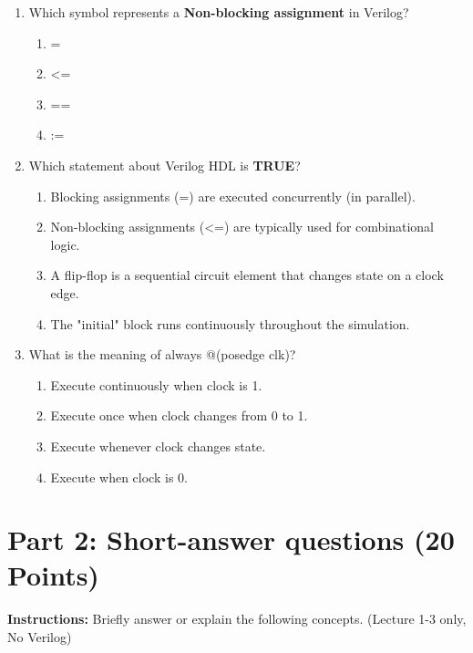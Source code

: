 \documentclass[a4paper,12pt]{article}
\begin{document}
\begin{enumerate}[label=\textbf{\arabic*.}]
    \item Which symbol represents a \textbf{Non-blocking assignment} in Verilog?
    \begin{enumerate}[label=\alph*)]
        \item =
        \item <=
        \item ==
        \item :=
    \end{enumerate}

    \item Which statement about Verilog HDL is \textbf{TRUE}?
    \begin{enumerate}[label=\alph*)]
        \item Blocking assignments (=) are executed concurrently (in parallel).
        \item Non-blocking assignments (<=) are typically used for combinational logic.
        \item A flip-flop is a sequential circuit element that changes state on a clock edge.
        \item The "initial" block runs continuously throughout the simulation.
    \end{enumerate}

    \item What is the meaning of always @(posedge clk)?
    \begin{enumerate}[label=\alph*)]
        \item Execute continuously when clock is 1.
        \item Execute once when clock changes from 0 to 1.
        \item Execute whenever clock changes state.
        \item Execute when clock is 0.
    \end{enumerate}
\end{enumerate}

\newpage

\section*{Part 2: Short-answer questions (20 Points)}
\textbf{Instructions:} Briefly answer or explain the following concepts. (Lecture 1-3 only, No Verilog)
\end{document}
